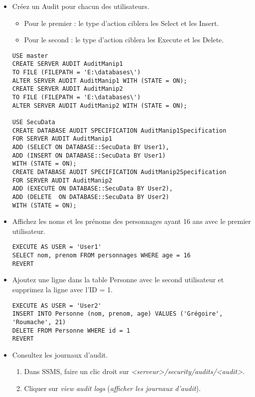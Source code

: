 \documentclass[a4paper]{article}
\begin{document}
\begin{itemize}
\item Créez un Audit pour chacun des utilisateurs.
\begin{itemize}
    \item Pour le premier : le type d’action ciblera les Select et les Insert.
    \item Pour le second : le type d’action ciblera les Execute et les Delete.
\end{itemize}
\begin{example}
    \begin{verbatim}
USE master
CREATE SERVER AUDIT AuditManip1
TO FILE (FILEPATH = 'E:\databases\')
ALTER SERVER AUDIT AuditManip1 WITH (STATE = ON);
CREATE SERVER AUDIT AuditManip2
TO FILE (FILEPATH = 'E:\databases\')
ALTER SERVER AUDIT AuditManip2 WITH (STATE = ON);
        
USE SecuData
CREATE DATABASE AUDIT SPECIFICATION AuditManip1Specification
FOR SERVER AUDIT AuditManip1
ADD (SELECT ON DATABASE::SecuData BY User1),
ADD (INSERT ON DATABASE::SecuData BY User1)
WITH (STATE = ON);
CREATE DATABASE AUDIT SPECIFICATION AuditManip2Specification
FOR SERVER AUDIT AuditManip2
ADD (EXECUTE ON DATABASE::SecuData BY User2),
ADD (DELETE  ON DATABASE::SecuData BY User2)
WITH (STATE = ON);
    \end{verbatim}
\end{example}



\item Affichez les noms et les prénoms des personnages ayant 16 ans avec le premier utilisateur.
\begin{example} \begin{verbatim}
EXECUTE AS USER = 'User1'
SELECT nom, prenom FROM personnages WHERE age = 16
REVERT
\end{verbatim} \end{example}



\item Ajoutez une ligne dans la table Personne avec le second utilisateur et supprimez la ligne avec l’ID = 1.
\begin{example} \begin{verbatim}
EXECUTE AS USER = 'User2'
INSERT INTO Personne (nom, prenom, age) VALUES ('Grégoire', 'Roumache', 21)
DELETE FROM Personne WHERE id = 1
REVERT
\end{verbatim} \end{example}



\item Consultez les journaux d’audit.
\begin{example}
    \begin{enumerate}
        \item Dans SSMS, faire un clic droit sur \textit{<serveur>/security/audits/<audit>}.
        \item Cliquer sur \textit{view audit logs} (\textit{afficher les journaux d'audit}).
    \end{enumerate}
\end{example}




\end{itemize}
\end{document}

